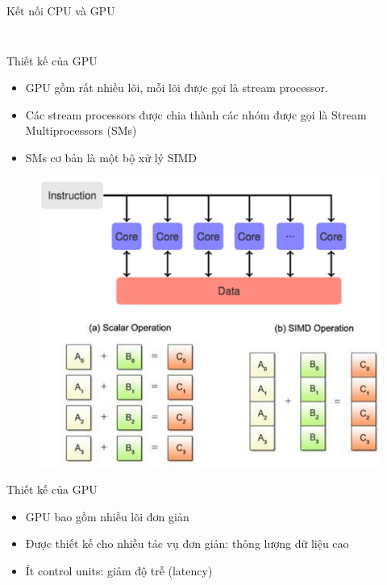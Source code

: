 \documentclass[10pt]{beamer}
\theoremstyle{remark}
\numberwithin{algocf}{section}
\numberwithin{equation}{section}
\numberwithin{dl}{section}
\numberwithin{figure}{section}
\begin{document}
\begin{frame}{Kết nối CPU và GPU}
\begin{columns}[onlytextwidth]
\begin{column}{0.65\linewidth}
\begin{figure}[H]
            \end{figure}
        \end{column}
    \end{columns}
\end{frame}

\begin{frame}{Thiết kế của GPU}
    \begin{itemize}
        \item GPU gồm rất nhiều lõi, mỗi lõi được gọi là stream processor.
        \item Các stream processors được chia thành các nhóm được gọi là Stream Multiprocessors (SMs)
        \item SMs cơ bản là một bộ xử lý SIMD
    \end{itemize}
    \begin{figure}[H]
        \centering
        \includegraphics[height=0.5\textheight]{figures/CUDA/SIMD.png}
    \end{figure}
\end{frame}

\begin{frame}{Thiết kế của GPU}
    \begin{itemize}
        \item GPU bao gồm nhiều lõi đơn giản
        \item Được thiết kế cho nhiều tác vụ đơn giản: thông lượng dữ liệu cao
        \item Ít control units: giảm độ trễ (latency)
    \end{itemize}
\end{frame}
\end{document}
